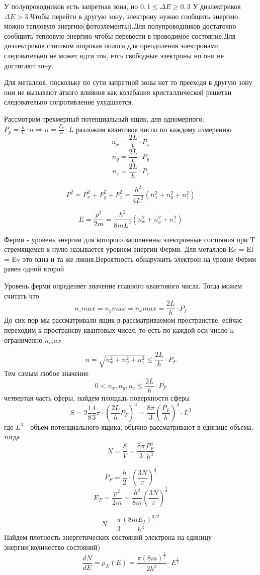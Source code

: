 \documentclass[../main.tex]{subfiles}
\begin{document}
У полупроводников есть запретная зона, но $ 0,1 \leq \Delta E \geq 0,3$
У диэлектриков $\Delta E > 3 $
Чтобы перейти в другую зону, электрону нужно сообщить энергию, можно тепловую энергию(фотоэлементы).Для полупроводников 
достаточно сообщить тепловую энергию чтобы перевести в проводимое состояние.Для диэлектриков слишком широкая полоса для преодоления электронами следовательно
не может идти ток, етсь свободные электроны но они не достигают зону.

Для металлов, поскольку по сути запретной зоны нет то прееходя в другую зону они не вызывают аткого влияния как колебания кристаллической решетки следовательно 
сопротивление ухудшается.

Рассмотрим трехмерный потенциальный ящик, для одномерного: $P_p = \frac{h}{L} \cdot n \Rightarrow n = \frac{P_p}{h} \cdot L$
разложим квантовое число по каждому измерению
\[n_x = \frac{2L}{h} \cdot P_x\]
\[n_y = \frac{2L}{h} \cdot P_y\]
\[n_z = \frac{2L}{h} \cdot P_z\]

\[P^2 = P^2_x + P^2_y + P^2_z = \frac{h^2}{4L^2}(n_x^2 + n_y^2+n_z^2)\]

\[E = \frac{p^2}{2m} = \frac{h^2}{8mL^2}(n_x^2 + n_y^2+n_z^2)\]

Ферми - уровень энергии для которого заполненны электронные состояния  при T стремящемся к нулю называется уровнем энергии Ферми.
Для металлов Ec = Ef = Ev это одна и та же линия.Вероятность обнаружить электрон на уровне Ферми равен одной второй 

Уровень ферми определяет значение главного квантового числа.
Тогда можем считать что 
\[n_zmax = n_ymax = n_xmax = \frac{2L}{h} \cdot P_f\]
До сих пор мы рассматривали ящик в рассматриваемом пространстве, есйчас переходим к пространсву квантовых чисел, то есть 
по каждой оси число n ограниченно $n_max$

\[n = \sqrt{n^2_x+n^2_y+n^2_z} \leq \frac{2L}{h} \cdot P_F\]
Тем самым любое значение 
\[0 < n_x, n_y,n_z \leq \frac{2L}{h} \cdot P_F\]
четвертая часть сферы, найдем площадь поверхности сферы
\[S = 2 \frac{1}{8} \frac{4}{3} \pi \cdot (\frac{2L}{h} P_F)^3 = \frac{8 \pi}{3} (\frac{P_F}{h})^3 \cdot L^3\]
где $L^3$ - объем потенциального ящика, обычно рассматривают в единице объема, тогда 
\[N = \frac{S}{V} = \frac{8 \pi}{3} \frac{P_F^3}{h^3}\]

\[P_F = \frac{h}{2} \cdot (\frac{3N}{\pi})^{\frac{1}{3}}\]
\[E_F = \frac{p^2}{2m} = \frac{h^2}{8m}(\frac{3N}{\pi})^{\frac{2}{3}}\]

\[N = \frac{\pi}{3} \frac{(8mE_f)^{3/2}}{h^3}\]
Найдем плотность энергетических состояний электрона на единицу энергии(количество состояний)
\[\frac{dN}{dE} = \rho_N(E) = \frac{\pi (8m)^{\frac{3}{2}}}{2 h^3} \cdot E^{\frac{1}{2}}\]
\end{document}

